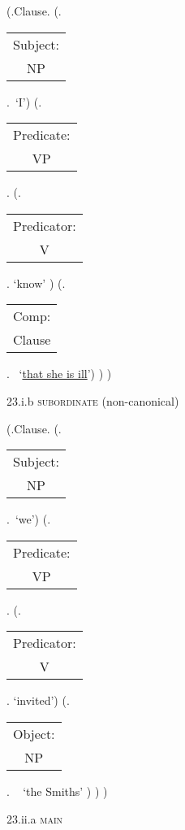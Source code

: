 \documentclass[12pt,letterpaper]{article}
\begin{document}
\begin{figure}
	\begin{center}
		\begin{parsetree}
			(.Clause.
			(.\begin{tabular}{c}Subject:\\NP\end{tabular}.~`I')
			(.\begin{tabular}{c}Predicate:\\VP\end{tabular}.
			(.\begin{tabular}{c}Predicator:\\V\end{tabular}. `know' )
			(.\begin{tabular}{c}Comp:\\Clause\end{tabular}.~ `\underline{that she is ill}')
			)
			)
			
			\hfill \break\hfill \break
		\end{parsetree}
		23.i.b \textsc{subordinate} (non-canonical)
	\end{center}
\end{figure}

\begin{figure}
	\begin{center}
		\begin{parsetree}
			(.Clause.
			(.\begin{tabular}{c}Subject:\\NP\end{tabular}.~`we')
			(.\begin{tabular}{c}Predicate:\\VP\end{tabular}.
			(.\begin{tabular}{c}Predicator:\\V\end{tabular}. `invited')
			(.\begin{tabular}{c}Object:\\NP\end{tabular}. ~  `the Smiths' )
			)
			)
			
			\hfill \break\hfill \break
		\end{parsetree}
		23.ii.a \textsc{main}
	\end{center}
\end{figure}
\end{document}
